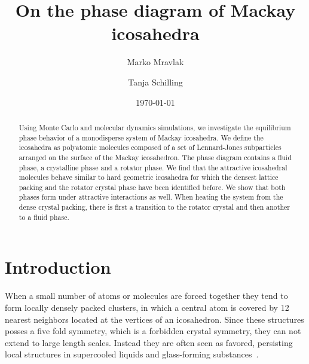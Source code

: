 \documentclass[10pt,aps,pre,twocolumn,superscriptaddress,amsmath,amssymb]{revtex4-1}
\begin{document}
\title{On the phase diagram of Mackay icosahedra}

\author{Marko Mravlak}
\author{Tanja Schilling}

\date[Date: ]{\today}

\begin{abstract}
Using Monte Carlo and molecular dynamics simulations, we investigate the equilibrium phase behavior of a monodisperse system of Mackay icosahedra.
We define the icosahedra as polyatomic molecules composed of a set of Lennard-Jones subparticles arranged on the surface of the Mackay icosahedron.
The phase diagram contains a fluid phase, a crystalline phase and a rotator phase.
We find that the attractive icosahedral molecules behave similar to hard geometric icosahedra for which the densest lattice packing and the rotator crystal phase have been identified before.
We show that both phases form under attractive interactions as well.
When heating the system from the dense crystal packing, there is first a transition to the rotator crystal and then another to a fluid phase.
\end{abstract}


\maketitle

\section{Introduction}

When a small number of atoms or molecules are forced together they tend to form locally densely packed clusters, in which a central atom is covered by 12 nearest neighbors located at the vertices of an icosahedron.
Since these structures posses a five fold symmetry, which is a forbidden crystal symmetry, they can not extend to large length scales. Instead they are often seen as favored, persisting local structures in supercooled liquids and glass-forming substances~\cite{Frank1952,Steinhardt1983}.
\end{document}
